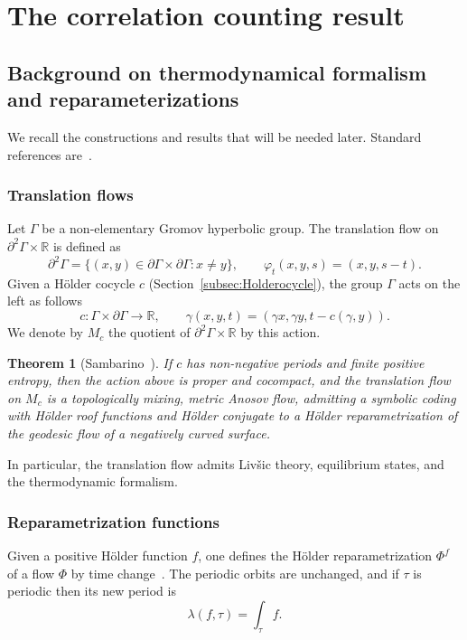 \documentclass[12pt]{amsart}
\numberwithin{equation}{section}
\numberwithin{figure}{section}
\newtheorem{theorem}[equation]{Theorem}
\theoremstyle{definition}
\theoremstyle{plain}
\begin{document}
\section{The correlation counting result}
\label{sec:correlation}

\subsection{Background on thermodynamical formalism and reparameterizations}
We recall the constructions and results that will be needed later. Standard references are~\cite{Bowen1972,Pollicott1987,Sambarino2014,ledrappier1994structure}.

\subsubsection{Translation flows}

Let $\Gamma$ be a non-elementary Gromov hyperbolic group. The translation flow on $\partial^2\Gamma\times\mathbb R$ is defined as
\[
\partial^2\Gamma
=
\{(x,y)\in\partial\Gamma\times\partial\Gamma:x\neq y\},
\qquad
\varphi_t(x,y,s)=(x,y,s-t).
\]
Given a H\"older cocycle $c$ (Section~\ref{subsec:Holderocycle}), the group $\Gamma$ acts on the left as follows
\[
c:\Gamma\times\partial\Gamma\to\mathbb R,
\qquad
\gamma(x,y,t)
=
(\gamma x,\gamma y,t-c(\gamma,y)).
\]
We denote by $M_c$ the quotient of $\partial^2\Gamma\times\mathbb R$ by this action.

\begin{theorem}[Sambarino~\cite{Sambarino2014}]
\label{translationMetricAnosov}
If $c$ has non-negative periods and finite positive entropy, then the action above is proper and cocompact, and the translation flow on $M_c$ is a topologically mixing, metric Anosov flow, admitting a symbolic coding with H\"older roof functions and H\"older conjugate to a H\"older reparametrization of the geodesic flow of a negatively curved surface.
\end{theorem}

In particular, the translation flow admits  Liv\v{s}ic theory, equilibrium states, and the thermodynamic formalism.

\subsubsection{Reparametrization functions}

Given a positive H\"older function $f$, one defines the H\"older reparametrization $\Phi^f$ of a flow $\Phi$ by time change~\cite[\S2]{Sambarino2014}. The periodic orbits are unchanged, and if $\tau$ is periodic then its new period is
\begin{equation}
\label{eqn:NewPeriod}
\lambda(f,\tau)=\int_\tau f.
\end{equation}
\end{document}

